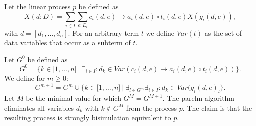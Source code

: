 \documentclass{article}
\begin{document}
Let the linear process $p$ be defined as%
\[
X(d:D)=\sum_{i\in I}\sum_{e:E_{i}}c_{i}(d,e)\rightarrow a_{i}(d,e)\circ
t_{i}(d,e)X(g_{i}(d,e)),
\]%
with $d=[d_{1},\ldots ,d_{n}]$. For an arbitrary term $t$ we define $Var(t)$
as the set of data variables that occur as a subterm of $t$.

\bigskip

Let $G^{0}$ be defined as
\[
G^{0}=\{k\in \lbrack 1,\ldots ,n]\ |\ \exists _{i\in I}:d_{k}\in
Var(c_{i}(d,e)\rightarrow a_{i}(d,e)\circ t_{i}(d,e))\}.
\]%
We define for $m\geq 0$:%
\[
G^{m+1}=G^{m}\cup \{k\in \lbrack 1,\ldots ,n]\ |\ \exists _{l\in
G^{m}}\exists _{i\in I}:d_{k}\in Var(g_{i}(d,e)_{l}\}.
\]%
Let $M$ be the minimal value for which $G^{M}=G^{M+1}$. The parelm algorithm
eliminates all variables $d_{k}$ with $k\notin G^{M}$ from the process $p$.
The claim is that the resulting process is strongly bisimulation equivalent
to $p$.
\end{document}

